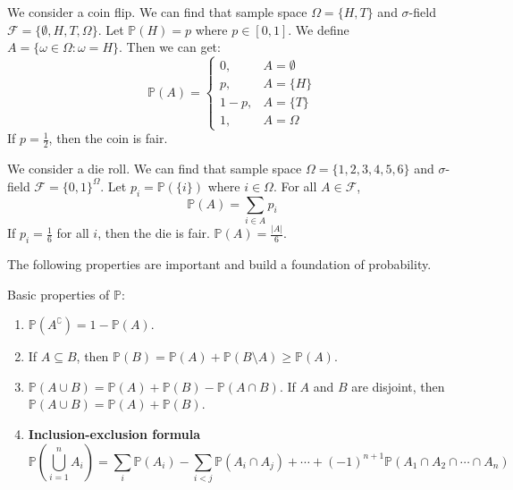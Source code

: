 \documentclass{huhtakm-template-book}
\newcommand{\prob}{\mathbb{P}}
\begin{document}
\newpage
\begin{eg}
	We consider a coin flip. We can find that sample space $\Omega=\{H,T\}$ and $\sigma$-field $\mathcal{F}=\{\emptyset,H,T,\Omega\}$. Let $\prob(H)=p$ where $p\in[0,1]$. We define $A=\{\omega\in\Omega:\omega = H\}$. Then we can get:
	\begin{equation*}
		\prob(A)=\begin{cases}
			0, &A=\emptyset\\
			p, &A=\{H\}\\
			1-p, &A=\{T\}\\
			1, &A=\Omega
		\end{cases}
	\end{equation*}
	If $p=\frac{1}{2}$, then the coin is fair.   
\end{eg}
\begin{eg}
	We consider a die roll. We can find that sample space $\Omega=\{1,2,3,4,5,6\}$ and $\sigma$-field $\mathcal{F}=\{0,1\}^{\Omega}$. Let $p_{i}=\prob(\{i\})$ where $i\in\Omega$. For all $A\in\mathcal{F}$,
	\begin{equation*}
		\prob(A)=\sum_{i\in A}p_{i}
	\end{equation*}
	If $p_{i}=\frac{1}{6}$ for all $i$, then the die is fair. $\prob(A)=\frac{|A|}{6}$.
\end{eg}
The following properties are important and build a foundation of probability.
\begin{lem}
	Basic properties of $\prob$:
	\begin{enumerate}
		\item $\prob(A^{\complement})=1-\prob(A)$.
		\item If $A\subseteq B$, then $\prob(B)=\prob(A)+\prob(B\setminus A)\geq\prob(A)$.
		\item $\prob(A\cup B)=\prob(A)+\prob(B)-\prob(A\cap B)$. If $A$ and $B$ are disjoint, then $\prob(A\cup B)=\prob(A)+\prob(B)$.
		\item \textbf{Inclusion-exclusion formula}
		\begin{equation*}
			\prob\left(\bigcup_{i=1}^{n}A_{i}\right)=\sum_{i}\prob(A_{i})-\sum_{i<j}\prob(A_{i}\cap A_{j})+\cdots+(-1)^{n+1}\prob(A_{1}\cap A_{2}\cap\cdots\cap A_{n})
		\end{equation*}
	\end{enumerate}
\end{lem}
\end{document}
